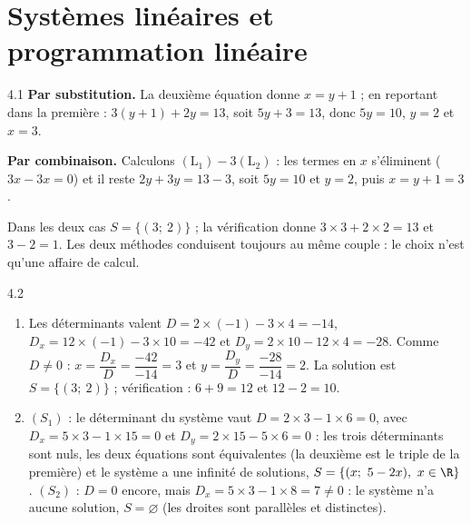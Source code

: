 \clearpage
\chapter{Systèmes linéaires et programmation linéaire}

\begin{corrige}{4.1}
\textbf{Par substitution.} La deuxième équation donne $x = y + 1$ ; en reportant dans la première : $3(y + 1) + 2y = 13$, soit $5y + 3 = 13$, donc $5y = 10$, $y = 2$ et $x = 3$.
\par\smallskip
\textbf{Par combinaison.} Calculons $(\text{L}_{1}) - 3(\text{L}_{2})$ : les termes en $x$ s'éliminent ($3x - 3x = 0$) et il reste $2y + 3y = 13 - 3$, soit $5y = 10$ et $y = 2$, puis $x = y + 1 = 3$.
\par\smallskip
Dans les deux cas $S = \{(3;\ 2)\}$ ; la vérification donne $3 \times 3 + 2 \times 2 = 13$ et $3 - 2 = 1$. Les deux méthodes conduisent toujours au même couple : le choix n'est qu'une affaire de calcul.
\end{corrige}

\begin{corrige}{4.2}
\begin{enumerate}
\item Les déterminants valent $D = 2 \times (-1) - 3 \times 4 = -14$, $D_{x} = 12 \times (-1) - 3 \times 10 = -42$ et $D_{y} = 2 \times 10 - 12 \times 4 = -28$. Comme $D \neq 0$ : $x = \dfrac{D_{x}}{D} = \dfrac{-42}{-14} = 3$ et $y = \dfrac{D_{y}}{D} = \dfrac{-28}{-14} = 2$. La solution est $S = \{(3;\ 2)\}$ ; vérification : $6 + 9 = 12$ et $12 - 2 = 10$.
\item $(S_{1})$ : le déterminant du système vaut $D = 2 \times 3 - 1 \times 6 = 0$, avec $D_{x} = 5 \times 3 - 1 \times 15 = 0$ et $D_{y} = 2 \times 15 - 5 \times 6 = 0$ : les trois déterminants sont nuls, les deux équations sont équivalentes (la deuxième est le triple de la première) et le système a une infinité de solutions, $S = \{(x;\ 5 - 2x),\ x \in \R\}$. $(S_{2})$ : $D = 0$ encore, mais $D_{x} = 5 \times 3 - 1 \times 8 = 7 \neq 0$ : le système n'a aucune solution, $S = \varnothing$ (les droites sont parallèles et distinctes).
\end{enumerate}
\end{corrige}

